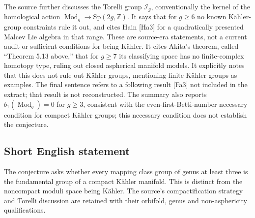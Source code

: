 \documentclass[11pt]{article}
\newcommand{\Z}{\mathbb{Z}}
\begin{document}
The source further discusses the Torelli group \(\mathcal I_g\), conventionally the kernel of the homological action \(\operatorname{Mod}_g\to\mathrm{Sp}(2g,\Z)\). It says that for \(g\ge6\) no known Kähler-group constraints rule it out, and cites Hain [Ha3] for a quadratically presented Malcev Lie algebra in that range. These are source-era statements, not a current audit or sufficient conditions for being Kähler. It cites Akita's theorem, called ``Theorem 5.13 above,'' that for \(g\ge7\) its classifying space has no finite-complex homotopy type, ruling out closed aspherical manifold models. It explicitly notes that this does not rule out Kähler groups, mentioning finite Kähler groups as examples. The final sentence refers to a following result [Fa3] not included in the extract; that result is not reconstructed. The summary also reports \(b_1(\operatorname{Mod}_g)=0\) for \(g\ge3\), consistent with the even-first-Betti-number necessary condition for compact Kähler groups; this necessary condition does not establish the conjecture.
\subsection{Short English statement}
The conjecture asks whether every mapping class group of genus at least three is the fundamental group of a compact Kähler manifold. This is distinct from the noncompact moduli space being Kähler. The source's compactification strategy and Torelli discussion are retained with their orbifold, genus and non-asphericity qualifications.
\end{document}
